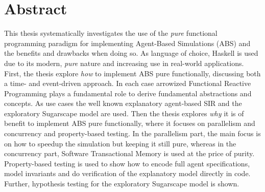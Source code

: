 \documentclass[oneside]{book}
\newcommand\blankpage{%
    \null
    \thispagestyle{empty}%
    \addtocounter{page}{-1}%
    \newpage}
\begin{document}
\cleardoublepage
\afterpage{\blankpage}

\clearpage
\tableofcontents

\newpage

\thispagestyle{plain}

\section*{Abstract}
This thesis systematically investigates the use of the \textit{pure} functional programming paradigm for implementing Agent-Based Simulations (ABS) and the benefits and drawbacks when doing so. As language of choice, Haskell is used due to its modern, \textit{pure} nature and increasing use in real-world applications. First, the thesis explore \textit{how} to implement ABS pure functionally, discussing both a time- and event-driven approach. In each case arrowized Functional Reactive Programming plays a fundamental role to derive fundamental abstractions and concepts. As use cases the well known explanatory agent-based SIR and the exploratory Sugarscape model are used. Then the thesis explores \textit{why} it is of benefit to implement ABS pure functionally, where it focuses on parallelism and concurrency and property-based testing. In the parallelism part, the main focus is on how to speedup the simulation but keeping it still pure, whereas in the concurrency part, Software Transactional Memory is used at the price of purity. Property-based testing is used to show how to encode full agent specifications, model invariants and do verification of the explanatory model directly in code. Further, hypothesis testing for the exploratory Sugarscape model is shown.

\clearpage
\end{document}
